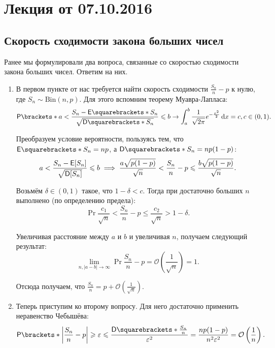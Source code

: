 \section{Лекция от 07.10.2016}

\subsection{Скорость сходимости закона больших чисел}
Ранее мы формулировали два вопроса, связанные со скоростью сходимости закона больших чисел. Ответим на них.

\begin{enumerate}
    \item В первом пункте от нас требуется найти скорость сходимости \(\frac{S_n}{n} - p\) к нулю, где \(S_n \sim \mathrm{Bin}(n, p)\). Для этого вспомним теорему Муавра-Лапласа:
    \[\Pr{a < \frac{S_n - \E{S_n}}{\sqrt{\D{S_n}}} \leq b} \to \int_{a}^{b} \frac{1}{\sqrt{2\pi}}e^{-\frac{x^2}{2}}\,\mathrm{d}x = c, c \in (0, 1).\]
    
    Преобразуем условие вероятности, пользуясь тем, что \(\E{S_n} = np\), а \(\D{S_n} = np(1 - p)\):
    \[a < \frac{S_n - \E[S_n]}{\sqrt{\D[S_n]}} \leq b \implies \frac{a\sqrt{p(1 - p)}}{\sqrt{n}} < \frac{S_n}{n} - p \leq \frac{b\sqrt{p(1 - p)}}{\sqrt{n}}.\]
    
    Возьмём \(\delta \in (0, 1)\) такое, что \(1 - \delta < c\). Тогда при достаточно больших \(n\) выполнено (по определению предела):
    \[\Pr{\frac{c_1}{\sqrt{n}} < \frac{S_n}{n} - p \leq \frac{c_2}{\sqrt{n}}} > 1 - \delta.\]
    
    Увеличивая расстояние между \(a\) и \(b\) и увеличивая \(n\), получаем следующий результат:
    \[\lim\limits_{n, |a - b| \to \infty} \Pr{\frac{S_n}{n} - p = \mathcal{O}\left(\frac{1}{\sqrt{n}}\right)} = 1.\]
    
    Отсюда получаем, что \(\frac{S_n}{n} = p + \mathcal{O}\left(\frac{1}{\sqrt{n}}\right)\).
    
    \item Теперь приступим ко второму вопросу. Для него достаточно применить неравенство Чебышёва:
    \[\Pr{\left|\frac{S_n}{n}-p\right| \geq \epsilon} \leq \frac{\D{\frac{S_n}{n}}}{\epsilon^2} =
    \frac{np(1 - p)}{n^2\epsilon^2} = \mathcal{O}\left(\frac{1}{n}\right).\]
\end{enumerate}

